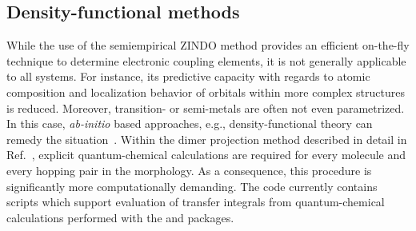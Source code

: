 \subsection{Density-functional methods}
\label{sec:dft}

While the use of the semiempirical ZINDO method provides an efficient on-the-fly technique to determine electronic coupling elements, it is not generally applicable to all systems. For instance, its predictive capacity with regards to atomic composition and localization behavior of orbitals within more complex structures is reduced. Moreover, transition- or semi-metals are often not even parametrized. In this case, {\it ab-initio} based approaches, e.g., density-functional theory can remedy the situation~\cite{huang_intermolecular_2004,huang_validation_2005,valeev_effect_2006,yin_balanced_2006,yang_theoretical_2007,baumeier_density-functional_2010}. Within the dimer projection method described in detail in Ref.~\cite{baumeier_density-functional_2010}, explicit quantum-chemical calculations are required for every molecule and every hopping pair in the morphology. As a consequence, this procedure is significantly more computationally demanding. The code currently contains scripts which support evaluation of transfer integrals from quantum-chemical calculations performed with the \gaussian and \turbomole packages.
